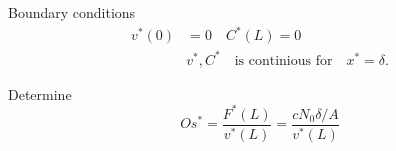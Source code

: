 \documentclass{article}
\theoremstyle{remark}
\begin{document}
Boundary conditions
\begin{align*}
  v^{*}\left( 0 \right) &=  0 \quad    C^{*}\left( L \right) = 0  \\
                        & v^{*}, C^{*} \quad   \text{is continious for} \quad  x^{*} = \delta 
.\end{align*}

Determine \[
O s^{*} = \frac{F^{*}\left( L \right)}{v^{*}\left( L \right)} = \frac{c N_{0}\delta /A }{v^{*}\left( L \right)}
\] 


\end{document}

